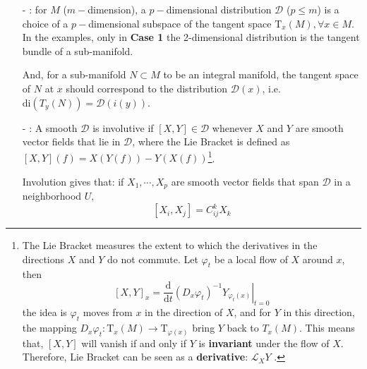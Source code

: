 \begin{enumerate}
    \item[-] \underline{}: for $M$ ($m-$dimension), a $p-$dimensional distribution $\mathcal{D}$ ($p\leq m$) is a choice of a $p-$dimensional subspace of the tangent space $\mathrm{T}_x(M),\forall x\in M$. In the examples, only in \textbf{Case 1} the 2-dimensional distribution is the tangent bundle of a sub-manifold.
    
    And, for a sub-manifold $N\subset M$ to be an integral manifold, the tangent space of $N$ at $x$ should correspond to the distribution $\mathcal{D}(x)$, i.e. $\mathrm{di}(T_y(N))=\mathcal{D}(i(y))$.
    
    \item[-] \underline{}: A smooth $\mathcal{D}$ is involutive if $[X,Y]\in \mathcal{D}$ whenever $X$ and $Y$ are smooth vector fields that lie in $\mathcal{D}$, where the Lie Bracket is defined as $[X,Y](f)=X(Y(f))-Y(X(f))$\footnote{The Lie Bracket measures the extent to which the derivatives in the directions $X$ and $Y$ do not commute. Let $\varphi_t$ be a local flow of $X$ around $x$, then 
    $$
    [X,Y]_x = \frac{\mathrm{d}}{\mathrm{d}t} \left.\left(D_x\varphi_t\right)^{-1} Y_{\varphi_t(x)} \right\vert_{t=0}
    $$
    the idea is $\varphi_t$ moves from $x$ in the direction of $X$, and for $Y$ in this direction, the mapping $D_x\varphi_t: \mathrm{T}_{x}(M)\rightarrow \mathrm{T}_{\varphi(x)}$ bring $Y$ back to $T_{x}(M)$. This means that, $[X,Y]$ will vanish if and only if $Y$ is \textbf{invariant} under the flow of $X$. Therefore, Lie Bracket can be seen as a \textbf{derivative}: $\mathcal{L}_XY$
    .}.
    
    Involution gives that: if $X_1,\cdots,X_p$ are smooth vector fields that span $\mathcal{D}$ in a neighborhood $U$,
    $$
    [X_i,X_j] = C_{ij}^kX_k
    $$
\end{enumerate}

